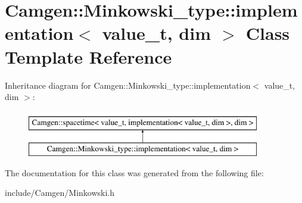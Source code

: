 \hypertarget{a00296}{}\section{Camgen\+:\+:Minkowski\+\_\+type\+:\+:implementation$<$ value\+\_\+t, dim $>$ Class Template Reference}
\label{a00296}
Inheritance diagram for Camgen\+:\+:Minkowski\+\_\+type\+:\+:implementation$<$ value\+\_\+t, dim $>$\+:\begin{figure}[H]
\begin{center}
\leavevmode
\includegraphics[height=2.000000cm]{a00296}
\end{center}
\end{figure}


The documentation for this class was generated from the following file\+:\begin{DoxyCompactItemize}
\item 
include/\+Camgen/Minkowski.\+h\end{DoxyCompactItemize}
